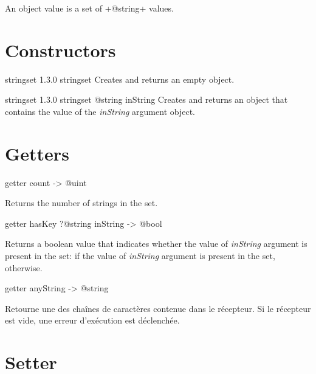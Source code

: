 

An  object value is a set of \ggs+@string+ values.\\

\section{Constructors}

{stringset}
{1.3.0}
{stringset}
{Creates and returns an empty  object.}
{}

{stringset}
{1.3.0}
{stringset}
{@string inString}
{Creates and returns an  object that contains the value of the \emph{inString} argument object.}
{}

\section{Getters}


\begin{galgascode}
getter count -> @uint
\end{galgascode}

Returns the number of strings in the set.




\begin{galgascode}
getter hasKey ?@string inString -> @bool
\end{galgascode}

Returns a boolean value that indicates whether the value of \emph{inString} argument is present in the set:  if the value of \emph{inString} argument is present in the set,  otherwise.



\begin{galgascode}
getter anyString -> @string
\end{galgascode}

Retourne une des chaînes de caractères contenue dans le récepteur. Si le récepteur est vide, une erreur d'exécution est déclenchée.




\section{Setter}


